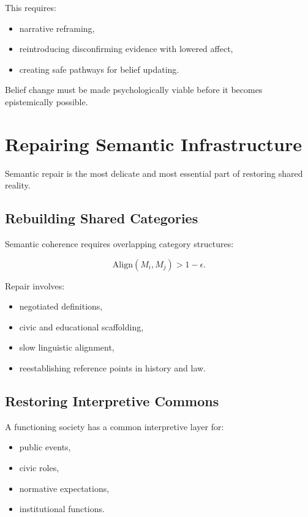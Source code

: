 \documentclass[12pt,oneside]{book}
\theoremstyle{plain}
\theoremstyle{definition}
\begin{document}
This requires:

\begin{itemize}
    \item narrative reframing,
    \item reintroducing disconfirming evidence with lowered affect,
    \item creating safe pathways for belief updating.
\end{itemize}

Belief change must be made psychologically viable before it becomes epistemically possible.

\section{Repairing Semantic Infrastructure}

Semantic repair is the most delicate and most essential part of restoring 
shared reality.

\subsection{Rebuilding Shared Categories}

Semantic coherence requires overlapping category structures:

\[
\mathrm{Align}(M_i, M_j) > 1 - \epsilon.
\]

Repair involves:

\begin{itemize}
    \item negotiated definitions,
    \item civic and educational scaffolding,
    \item slow linguistic alignment,
    \item reestablishing reference points in history and law.
\end{itemize}

\subsection{Restoring Interpretive Commons}

A functioning society has a common interpretive layer for:

\begin{itemize}
    \item public events,
    \item civic roles,
    \item normative expectations,
    \item institutional functions.
\end{itemize}
\end{document}

